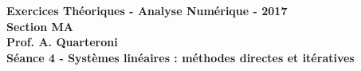 \begin{center}
  \textbf{Exercices Théoriques - Analyse Numérique - 2017 \\
  Section MA \\
  Prof. A. Quarteroni \\
  Séance 4 - Systèmes linéaires : méthodes directes et itératives}
\end{center}


\vspace{10mm}

\begin{ex}

\end{ex}

\begin{ex}

\end{ex}

\begin{ex}

\end{ex}

\begin{ex}

\end{ex}

